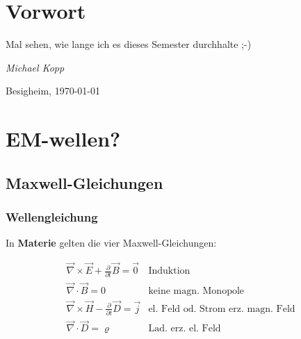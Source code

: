 \documentclass[twoside,a4paper]{book}
\newcommand{\Ve}[1]{\ensuremath{\vec{#1}}}
\newcommand{\Rot}{\ensuremath{\Ve \nabla \times }}
\newcommand{\Div}{\ensuremath{\Ve \nabla \cdot }}
\begin{document}
\chapter{Vorwort}
\label{kap_vorwort}

Mal sehen, wie lange ich es dieses Semester durchhalte ;-)

\vfill
\hfill \textit{Michael Kopp}

\hfill Besigheim, \today





\mainmatter











\chapter{EM-wellen?}
\label{kap_em-wellen}


\section{Maxwell-Gleichungen}
\label{kap_maxwell-gleichungen}



\subsection{Wellengleichung}
\label{kap_wellengleichung}




In \textbf{Materie} gelten die vier Maxwell-Gleichungen:
\begin{Wichtig}
   \begin{eqnarray}
      \label{eq:1}
      \Rot \vec E + \frac{\partial }{\partial t} \vec B = \vec 0 & \text{Induktion} \\
      \label{eq:2}
      \Div \vec B = 0 & \text{keine magn. Monopole}\\
      \label{eq:3}
      \Rot \vec H - \frac{\partial }{\partial t}\vec D = \vec j &
      \text{el. Feld od. Strom erz. magn. Feld}\\
      \label{eq:4}
      \Div \vec D = \varrho & \text{Lad. erz. el. Feld}
   \end{eqnarray}
\end{Wichtig}
\end{document}
